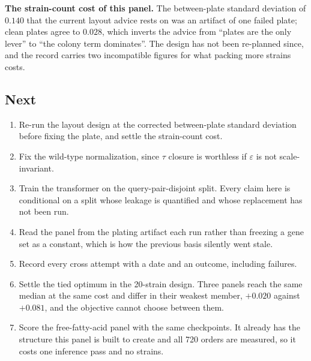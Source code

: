 \textbf{The strain-count cost of this panel.} The between-plate standard
deviation of $0.140$ that the current layout advice rests on was an artifact of
one failed plate; clean plates agree to $0.028$, which inverts the advice from
``plates are the only lever'' to ``the colony term dominates''. The design has
not been re-planned since, and the record carries two incompatible figures for
what packing more strains costs.

\subsection{Next}

\begin{enumerate}
  \item Re-run the layout design at the corrected between-plate standard
    deviation before fixing the plate, and settle the strain-count cost.
  \item Fix the wild-type normalization, since $\tau$ closure is worthless if
    $\varepsilon$ is not scale-invariant.
  \item Train the transformer on the query-pair-disjoint split. Every claim here
    is conditional on a split whose leakage is quantified and whose replacement
    has not been run.
  \item Read the panel from the plating artifact each run rather than freezing a
    gene set as a constant, which is how the previous basis silently went stale.
  \item Record every cross attempt with a date and an outcome, including
    failures.
  \item Settle the tied optimum in the 20-strain design. Three panels reach the
    same median at the same cost and differ in their weakest member, $+0.020$
    against $+0.081$, and the objective cannot choose between them.
  \item Score the free-fatty-acid panel with the same checkpoints. It already has
    the structure this panel is built to create and all 720 orders are measured,
    so it costs one inference pass and no strains.
\end{enumerate}
